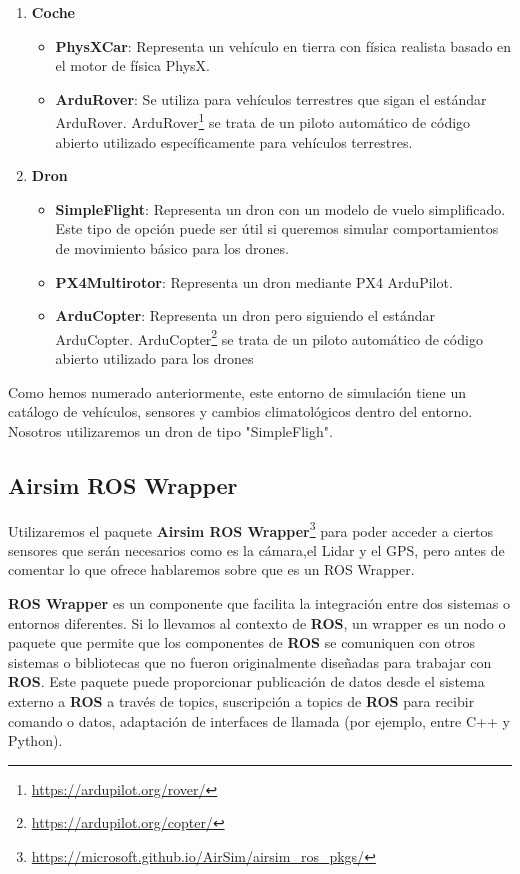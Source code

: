 \begin{enumerate}
  \item \textbf{Coche}
    \begin{itemize}
      \item \textbf{PhysXCar}: Representa un vehículo en tierra con física realista basado en el motor de física PhysX.
      \item \textbf{ArduRover}: Se utiliza para vehículos terrestres que sigan el estándar ArduRover. ArduRover\footnote{\url{https://ardupilot.org/rover/}} 
      se trata de un piloto automático de código abierto utilizado específicamente para vehículos terrestres.
    \end{itemize}
    
  \item \textbf{Dron}
    \begin{itemize}
      \item \textbf{SimpleFlight}: Representa un dron con un modelo de vuelo simplificado. Este tipo de opción puede ser útil si queremos simular comportamientos 
      de movimiento básico para los drones.
      \item \textbf{PX4Multirotor}: Representa un dron mediante PX4 ArduPilot. 
      \item \textbf{ArduCopter}: Representa un dron pero siguiendo el estándar ArduCopter. ArduCopter\footnote{\url{https://ardupilot.org/copter/}} 
      se trata de un piloto automático de código abierto utilizado para los drones 
    \end{itemize}
  
\end{enumerate}

Como hemos numerado anteriormente, este entorno de simulación tiene un catálogo de vehículos, sensores y
cambios climatológicos dentro del entorno. Nosotros utilizaremos un dron de tipo "SimpleFligh". 

\subsection{Airsim ROS Wrapper}
\label{sec:wrapper}
Utilizaremos el paquete \textbf{Airsim ROS Wrapper}\footnote{\url{https://microsoft.github.io/AirSim/airsim_ros_pkgs/}} para poder acceder a ciertos sensores 
que serán necesarios como es la cámara,el Lidar y el GPS, pero antes de comentar lo que ofrece hablaremos sobre que es un ROS Wrapper. \newline

\textbf{ROS Wrapper} es un componente que facilita la integración entre dos sistemas o entornos diferentes. Si lo llevamos al contexto de \textbf{ROS}, un wrapper es un nodo o paquete 
que permite que los componentes de \textbf{ROS} se comuniquen con otros sistemas o bibliotecas que no fueron originalmente diseñadas para trabajar con \textbf{ROS}. Este paquete 
puede proporcionar publicación de datos desde el sistema externo a \textbf{ROS} a través de topics, suscripción a topics de \textbf{ROS} para recibir comando o datos, adaptación 
de interfaces de llamada (por ejemplo, entre C++ y Python). \newline

